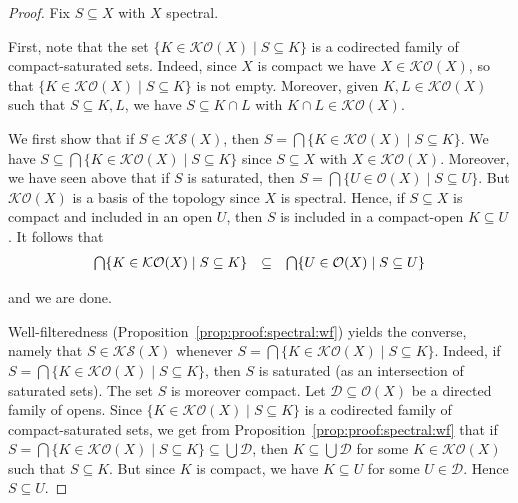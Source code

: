 \documentclass[%
  a4paper,
  UKenglish,
  cleveref,
  autoref,
  thm-restate,
  numberwithinsect,
]{lipics-v2021}
\newcommand\sle\subseteq
\newcommand\SP{S}			%
\newcommand\Open{\mathcal{O}}		%
\newcommand\K{\mathcal{K}}		%
\newcommand\Sat{\mathcal{S}}		%
\begin{document}
\begin{proof}
Fix $\SP \sle X$ with $X$ spectral.

First, note that
the set $\{ K \in \K\Open(X) \mid \SP \sle K\}$
is a codirected family of compact-saturated sets.
Indeed, since $X$ is compact we have $X \in \K\Open(X)$,
so that $\{ K \in \K\Open(X) \mid \SP \sle K\}$ is not empty.
Moreover, given $K, L \in \K\Open(X)$ such that $\SP \sle K,L$,
we have $\SP \sle K \cap L$ with $K \cap L \in \K\Open(X)$.


We first show that if $\SP \in \K\Sat(X)$,
then $\SP = \bigcap \{ K \in \K\Open(X) \mid \SP  \sle K\}$.
We have $\SP \sle \bigcap \{ K \in \K\Open(X) \mid \SP  \sle K\}$
since $\SP \sle X$ with $X \in \K\Open(X)$.
Moreover, we have seen above that if $\SP$ is saturated,
then
$\SP = \bigcap \{ U \in \Open(X) \mid \SP  \sle U\}$.
But $\K\Open(X)$ is a basis of the topology since $X$ is spectral.
Hence, if $\SP \sle X$ is compact and included in an open $U$,
then $\SP$ is included in a compact-open $K \sle U$.
It follows that
\[
\begin{array}{l l l}
  \bigcap \{ K \in \K\Open(X) \mid \SP  \sle K \}
& \sle
& \bigcap \{ U \in \Open(X) \mid \SP  \sle U \}
\end{array}
\]

\noindent
and we are done.

Well-filteredness
(Proposition~\ref{prop:proof:spectral:wf}) yields the converse,
namely that $\SP \in \K\Sat(X)$ whenever
$\SP = \bigcap \{ K \in \K\Open(X) \mid \SP \sle K\}$.
Indeed, if $\SP = \bigcap \{ K \in \K\Open(X) \mid \SP \sle K\}$,
then $\SP$ is saturated (as an intersection of saturated sets).
The set $\SP$ is moreover compact.
Let $\mathcal{D} \sle \Open(X)$ be a directed family of opens.
Since $\{ K \in \K\Open(X) \mid \SP \sle K\}$
is a codirected family of compact-saturated sets,
we get from Proposition~\ref{prop:proof:spectral:wf}
that if
$\SP = \bigcap \{ K \in \K\Open(X) \mid \SP \sle K\} \sle \bigcup \mathcal{D}$,
then $K \sle \bigcup \mathcal{D}$ for some $K \in \K\Open(X)$ such that $\SP \sle K$.
But since $K$ is compact, we have $K \sle U$ for some $U \in \mathcal{D}$.
Hence $\SP \sle U$.
\end{proof}
\end{document}
